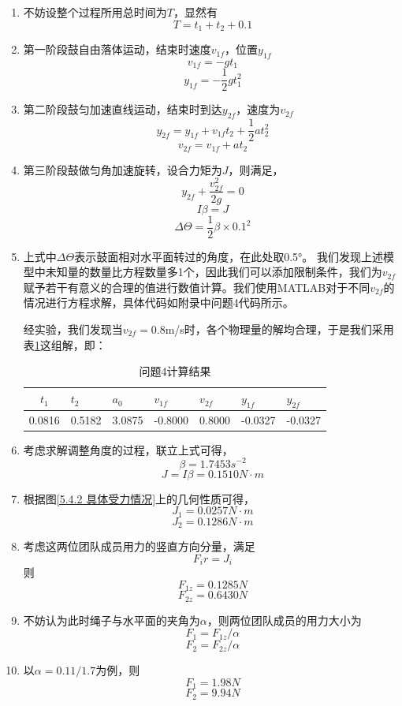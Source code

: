 \documentclass[nocover]{cumcmart}%
\begin{document}
\begin{enumerate}[(1)]
    \item 不妨设整个过程所用总时间为$T$，显然有
    $$T = t_1 +t_2 +0.1$$
    \item 第一阶段鼓自由落体运动，结束时速度$v_{1f}$，位置$y_{1f}$
    $$v_{1f} = -gt_1$$
    $$y_{1f} = -\frac{1}{2} g t_1^2$$
    \item 第二阶段鼓匀加速直线运动，结束时到达$y_{2f}$，速度为$v_{2f}$
    $$y_{2f} = y_{1f} + v_{1f}t_2 + \frac{1}{2}a t_2^2$$
    $$v_{2f} = v_{1f} + a t_2$$
    \item 第三阶段鼓做匀角加速旋转，设合力矩为$J$，则满足，
    $$y_{2f} + \frac{v_{2f}^2}{2g} = 0$$
    $$I\beta = J$$
    $$\Delta \Theta = \frac{1}{2}\beta \times 0.1^2$$
   
   \item
   上式中$\Delta \Theta$表示鼓面相对水平面转过的角度，在此处取0.5°。
我们发现上述模型中未知量的数量比方程数量多1个，因此我们可以添加限制条件，我们为$v_{2f}$赋予若干有意义的合理的值进行数值计算。我们使用MATLAB对于不同$v_{2f}$的情况进行方程求解，具体代码如附录中问题4代码所示。

经实验，我们发现当$v_{2f}=0.8$m/s时，各个物理量的解均合理，于是我们采用表\ref{table:result3}这组解，即：


\begin{table} [!h]
\begin{center}
\vspace{-0.1in}
\caption{问题4计算结果}
\label{table:result3}
\begin{tabular}{|c|l|l|l|l|l|l|}
\hline
$t_1$ & $t_2$ & $a_0$ & $v_{1f}$ & $v_{2f}$ & $y_{1f}$ & $y_{2f}$\\
\hline
 0.0816   & 0.5182 &   3.0875&   -0.8000    &0.8000&   -0.0327  & -0.0327\\
\hline
\end{tabular}
\vspace{-0.2in}
\end{center}
\end{table}

\item
考虑求解调整角度的过程，联立上式可得，
$$\beta = 1.7453 s^{-2}$$
$$J = I\beta = 0.1510 N\cdot m$$
\item
根据图\ref{5.4.2 具体受力情况}上的几何性质可得，
$$J_1 = 0.0257 N\cdot m$$
$$J_2 = 0.1286 N\cdot m$$
\item
考虑这两位团队成员用力的竖直方向分量，满足
$$F_i r = J_i$$
则
$$F_{1z} = 0.1285 N$$
$$F_{2z} = 0.6430 N$$
\item
不妨认为此时绳子与水平面的夹角为$\alpha$，则两位团队成员的用力大小为
$$F_{1} = F_{1z}/\alpha$$
$$F_{2} = F_{2z}/\alpha$$
\item
以$\alpha = 0.11/1.7$为例，则
$$F_{1} = 1.98 N$$
$$F_{2} = 9.94 N$$

\end{enumerate}
\end{document}
